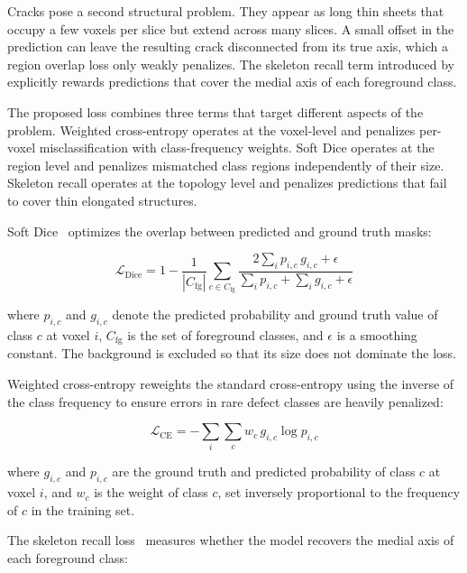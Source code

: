 Cracks pose a second structural problem. They appear as long thin sheets that occupy a few voxels per slice but extend across many slices. A small offset in the prediction can leave the resulting crack disconnected from its true axis, which a region overlap loss only weakly penalizes. The skeleton recall term introduced by~\cite{kirchhoff2024skeletonrecall} explicitly rewards predictions that cover the medial axis of each foreground class.

The proposed loss combines three terms that target different aspects of the problem. Weighted cross-entropy operates at the voxel-level and penalizes per-voxel misclassification with class-frequency weights. Soft Dice operates at the region level and penalizes mismatched class regions independently of their size. Skeleton recall operates at the topology level and penalizes predictions that fail to cover thin elongated structures.

Soft Dice~\cite{milletari2016vnet} optimizes the overlap between predicted and ground truth masks:

\begin{equation}
\mathcal{L}_{\text{Dice}} = 1 - \frac{1}{|C_{\text{fg}}|} \sum_{c \in C_{\text{fg}}} \frac{2 \sum_i p_{i,c} \, g_{i,c} + \epsilon}{\sum_i p_{i,c} + \sum_i g_{i,c} + \epsilon}
\label{eq:dice}
\end{equation}

where $p_{i,c}$ and $g_{i,c}$ denote the predicted probability and ground truth value of class $c$ at voxel $i$, $C_{\text{fg}}$ is the set of foreground classes, and $\epsilon$ is a smoothing constant. The background is excluded so that its size does not dominate the loss.

Weighted cross-entropy reweights the standard cross-entropy using the inverse of the class frequency to ensure errors in rare defect classes are heavily penalized:

\begin{equation}
\mathcal{L}_{\text{CE}} = -\sum_i \sum_c w_c \, g_{i,c} \log p_{i,c}
\label{eq:ce}
\end{equation}

where $g_{i,c}$ and $p_{i,c}$ are the ground truth and predicted probability of class $c$ at voxel $i$, and $w_c$ is the weight of class $c$, set inversely proportional to the frequency of $c$ in the training set.

The skeleton recall loss~\cite{kirchhoff2024skeletonrecall} measures whether the model recovers the medial axis of each foreground class:

